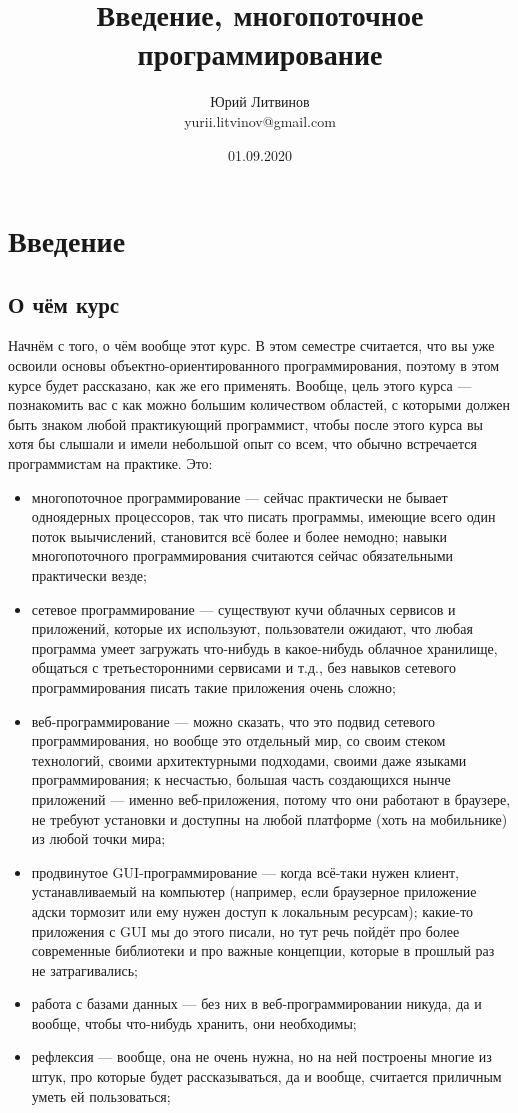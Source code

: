 \documentclass[a5paper]{article}
\title{Введение, многопоточное программирование}
\author{Юрий Литвинов\\\small{yurii.litvinov@gmail.com}}
\date{01.09.2020}
\begin{document}
\maketitle
\thispagestyle{empty}

\section{Введение}

\subsection{О чём курс}

Начнём с того, о чём вообще этот курс. В этом семестре считается, что вы уже освоили основы объектно-ориентированного программирования, поэтому в этом курсе будет рассказано, как же его применять. Вообще, цель этого курса --- познакомить вас с как можно большим количеством областей, с которыми должен быть знаком любой практикующий программист, чтобы после этого курса вы хотя бы слышали и имели небольшой опыт со всем, что обычно встречается программистам на практике. Это:

\begin{itemize}
    \item многопоточное программирование --- сейчас практически не бывает одноядерных процессоров, так что писать программы, имеющие всего один поток выычислений, становится всё более и более немодно; навыки многопоточного программирования считаются сейчас обязательными практически везде;
    \item сетевое программирование --- существуют кучи облачных сервисов и приложений, которые их используют, пользователи ожидают, что любая программа умеет загружать что-нибудь в какое-нибудь облачное хранилище, общаться с третьесторонними сервисами и т.д., без навыков сетевого программирования писать такие приложения очень сложно;
    \item веб-программирование --- можно сказать, что это подвид сетевого программирования, но вообще это отдельный мир, со своим стеком технологий, своими архитектурными подходами, своими даже языками программирования; к несчастью, большая часть создающихся нынче приложений --- именно веб-приложения, потому что они работают в браузере, не требуют установки и доступны на любой платформе (хоть на мобильнике) из любой точки мира;
    \item продвинутое GUI-программирование --- когда всё-таки нужен клиент, устанавливаемый на компьютер (например, если браузерное приложение адски тормозит или ему нужен доступ к локальным ресурсам); какие-то приложения с GUI мы до этого писали, но тут речь пойдёт про более современные библиотеки и про важные концепции, которые в прошлый раз не затрагивались;
    \item работа с базами данных --- без них в веб-программировании никуда, да и вообще, чтобы что-нибудь хранить, они необходимы;
    \item рефлексия --- вообще, она не очень нужна, но на ней построены многие из штук, про которые будет рассказываться, да и вообще, считается приличным уметь ей пользоваться;
\end{itemize}
\end{document}
